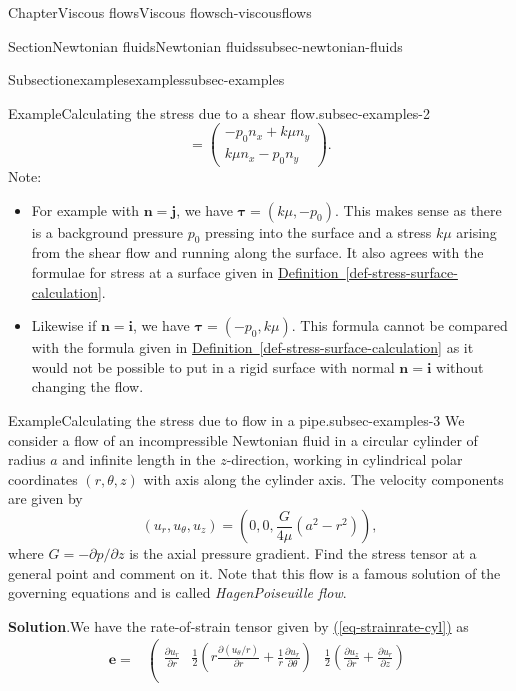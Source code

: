 \documentclass[oneside,10pt,]{book}
\newcommand{\blocktitlefont}{\relax}
\newcommand{\xreffont}{\relax}
\newcommand{\ptxlistdisc}{\raisebox{0.3ex}{\textbullet}}
\numberwithin{equation}{section}
\newcommand{\pd}[2]{\frac{\partial#1}{\partial#2}}
\newcommand{\be}{\boldsymbol{e}}
\newcommand{\bn}{\boldsymbol{n}}
\newcommand{\btau}{\boldsymbol{\tau}}
\newcommand{\bi}{\boldsymbol{i}}
\newcommand{\bj}{\boldsymbol{j}}
\begin{document}
\begin{chapterptx}{Chapter}{Viscous flows}{}{Viscous flows}{}{}{ch-viscousflows}
\begin{sectionptx}{Section}{Newtonian fluids}{}{Newtonian fluids}{}{}{subsec-newtonian-fluids}
\begin{subsectionptx}{Subsection}{examples}{}{examples}{}{}{subsec-examples}
\begin{example}{Example}{Calculating the stress due to a shear flow.}{subsec-examples-2}
\begin{equation*}
=\left(\begin{matrix}-p_0n_x+k\mu n_y\\k\mu n_x-p_0n_y\end{matrix}\right).
\end{equation*}
Note:%
\begin{itemize}[label=\ptxlistdisc]
\item{}For example with \(\bn=\bj\), we have \(\btau=(k\mu,-p_0)\). This makes sense as there is a background pressure \(p_0\) pressing into the surface and a stress \(k\mu\) arising from the shear flow and running along the surface. It also agrees with the formulae for stress at a surface given in \hyperref[def-stress-surface-calculation]{Definition~{\xreffont\ref{def-stress-surface-calculation}}}.%
\item{}Likewise if \(\bn=\bi\), we have \(\btau=(-p_0,k\mu)\). This formula cannot be compared with the formula given in \hyperref[def-stress-surface-calculation]{Definition~{\xreffont\ref{def-stress-surface-calculation}}} as it would not be possible to put in a rigid surface with normal \(\bn=\bi\) without changing the flow.%
\end{itemize}
%
\end{example}
\begin{example}{Example}{Calculating the stress due to flow in a pipe.}{subsec-examples-3}%
We consider a flow of an incompressible Newtonian fluid in a circular cylinder of radius \(a\) and infinite length in the \(z\)-direction, working in cylindrical polar coordinates \((r,\theta,z)\) with axis along the cylinder axis. The velocity components are given by%
\begin{equation*}
(u_r,u_\theta,u_z)=\left(0,0,\frac{G}{4\mu}\left(a^2-r^2\right)\right),
\end{equation*}
where \(G=-\partial p/\partial z\) is the axial pressure gradient. Find the stress tensor at a general point and comment on it. Note that this flow is a famous solution of the governing equations and is called \emph{Hagen\textendash{}Poiseuille flow}.%
\par\smallskip%
\noindent\textbf{\blocktitlefont Solution}.\hypertarget{subsec-examples-3-3}{}\quad{}We have the rate-of-strain tensor given by \hyperref[eq-strainrate-cyl]{({\xreffont\ref{eq-strainrate-cyl}})} as%
\begin{align*}
\be=&\left(\begin{matrix}
\pd{u_r}{r}&\frac12\left(r\pd{(u_\theta/r)}{r}+\frac1r\pd{u_r}{\theta}\right)&\frac12\left(\pd{u_z}{r}+\pd{u_r}{z}\right)\\

\end{matrix}
\end{align*}
\end{example}
\end{subsectionptx}
\end{sectionptx}
\end{chapterptx}
\end{document}
